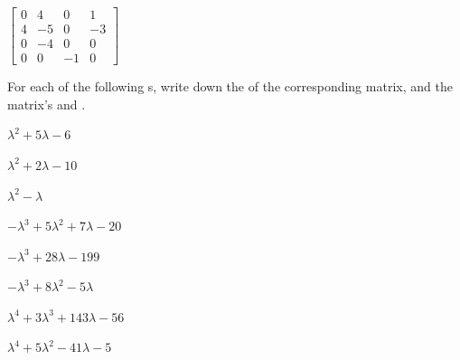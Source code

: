 \begin{exercise}
\begin{parts}
\item \(\begin{bmatrix} 0 & 4 & 0 & 1
\\4 & -5 & 0 & -3
\\0 & -4 & 0 & 0
\\0 & 0 & -1 & 0 \end{bmatrix}\)

\end{parts}
\end{exercise}








\begin{exercise} \label{ex:} 
For each of the following s, write down the  of the corresponding matrix, and the matrix's  and .
\begin{parts}
\item \(\lambda^2+5\lambda-6\)

\item \(\lambda^2+2\lambda-10\)

\item \(\lambda^2-\lambda\)

\item \(-\lambda^3+5\lambda^2+7\lambda-20\)

\item \(-\lambda^3+28\lambda-199\)

\item \(-\lambda^3+8\lambda^2-5\lambda\)

\item \(\lambda^4+3\lambda^3+143\lambda-56\)

\item \(\lambda^4+5\lambda^2-41\lambda-5\)

\end{parts}
\end{exercise}




